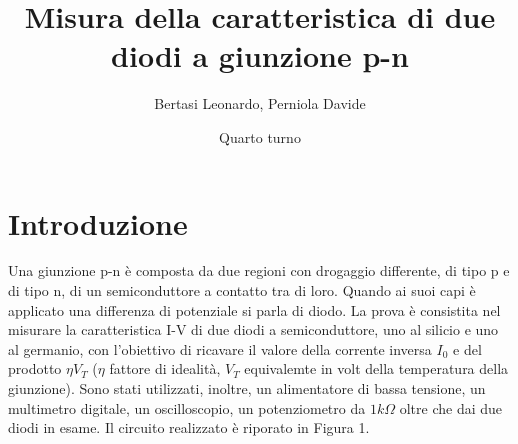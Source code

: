 \documentclass{article}
\title{Misura della caratteristica di due diodi a giunzione p-n}
\date{Quarto turno}
\author{Bertasi Leonardo, Perniola Davide }
\begin{document}
\maketitle
\section{Introduzione} 
Una giunzione p-n è composta da due regioni con drogaggio differente, di tipo p e di tipo n, di un semiconduttore a contatto tra di loro. Quando ai suoi capi è applicato una differenza di potenziale si parla di diodo. 
La prova è consistita nel misurare la caratteristica I-V di due diodi a semiconduttore, uno al silicio e uno al germanio, con l'obiettivo di ricavare il valore della corrente inversa $I_0$ e del prodotto $\eta V_T$ ($\eta$ fattore di idealità, $V_T$ equivalemte in volt della temperatura della giunzione).
Sono stati utilizzati, inoltre, un alimentatore di bassa tensione, un multimetro digitale, un oscilloscopio, un potenziometro da $1k\Omega$ oltre che dai due diodi in esame.
Il circuito realizzato è riporato in Figura 1.
\vspace{0.5cm}
\end{document}
